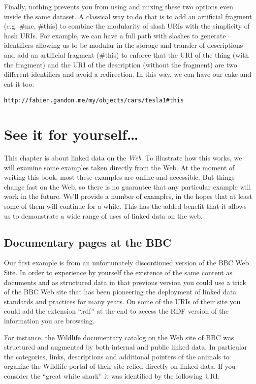 Finally, nothing prevents you from using and mixing these two options
even inside the same dataset. A classical way to do that is to add an
artificial fragment (e.g. \#me, \#this) to combine the modularity of 
slash URIs with the simplicity  of  hash URIs. For example, we can have a full
path with slashes to generate identifiers allowing us to be modular in
the storage and transfer of descriptions and add an artificial fragment
(\#this) to enforce that the URI of the thing (with the fragment) and
the URI of the description (without the fragment) are two different
identifiers and avoid a redirection. In this way, we can have our
cake and eat it too:

\begin{lstlisting}
http://fabien.gandon.me/my/objects/cars/tesla1#this
\end{lstlisting}

\hypertarget{see-it-for-yourself}{%
\section{See it for yourself\ldots{}}\label{see-it-for-yourself}}

This chapter is about linked data on the \emph{Web}.  To illustrate 
how this works, we will examine some examples taken directly from the Web. At
the moment of writing this book, most these examples are online and
accessible.   But things change fast on the Web, so there is no guarantee that 
any particular example will work in the future.   We'll provide a number of examples,
in the hopes that at least some of them will continue for a while.  This has the added benefit 
that it allows us to demonstrate a wide range of uses of linked data on the web. 

\subsection{Documentary pages at the BBC}

Our first example is from an unfortunately discontinued version of the
BBC Web Site. In order to experience by yourself the existence of the
same content as documents and as structured data in that previous
version you could use a trick of the BBC Web site that has been
pioneering the deployment of linked data standards and practices for
many years. On some of the URIs of their site you could add the
extension ``.rdf'' at the end to access the RDF version of the
information you are browsing.

For instance, the Wildlife documentary catalog on the Web site of BBC
was structured and augmented by both internal and public linked data. In
particular the categories, links, descriptions and additional pointers
of the animals to organize the Wildlife portal of their site relied
directly on linked data. If you consider the ``great white shark'' it
was identified by the following URI:

